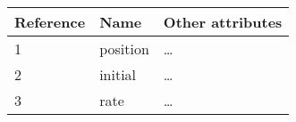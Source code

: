 \documentclass{standalone}
\begin{document}
\begin{tabularx}{\textwidth}{XXX}
    Reference & Name & Other attributes \\
        \midrule
        1 & position & \dots \\
        2 & initial & \dots \\
        3 & rate & \dots \\
\end{tabularx}
\end{document}
